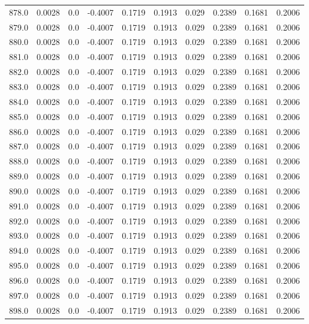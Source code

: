 \begin{longtable}{lrrrrrrrrr}
878.0 & 0.0028 & 0.0 & -0.4007 & 0.1719 & 0.1913 & 0.029 & 0.2389 & 0.1681 & 0.2006 \\
879.0 & 0.0028 & 0.0 & -0.4007 & 0.1719 & 0.1913 & 0.029 & 0.2389 & 0.1681 & 0.2006 \\
880.0 & 0.0028 & 0.0 & -0.4007 & 0.1719 & 0.1913 & 0.029 & 0.2389 & 0.1681 & 0.2006 \\
881.0 & 0.0028 & 0.0 & -0.4007 & 0.1719 & 0.1913 & 0.029 & 0.2389 & 0.1681 & 0.2006 \\
882.0 & 0.0028 & 0.0 & -0.4007 & 0.1719 & 0.1913 & 0.029 & 0.2389 & 0.1681 & 0.2006 \\
883.0 & 0.0028 & 0.0 & -0.4007 & 0.1719 & 0.1913 & 0.029 & 0.2389 & 0.1681 & 0.2006 \\
884.0 & 0.0028 & 0.0 & -0.4007 & 0.1719 & 0.1913 & 0.029 & 0.2389 & 0.1681 & 0.2006 \\
885.0 & 0.0028 & 0.0 & -0.4007 & 0.1719 & 0.1913 & 0.029 & 0.2389 & 0.1681 & 0.2006 \\
886.0 & 0.0028 & 0.0 & -0.4007 & 0.1719 & 0.1913 & 0.029 & 0.2389 & 0.1681 & 0.2006 \\
887.0 & 0.0028 & 0.0 & -0.4007 & 0.1719 & 0.1913 & 0.029 & 0.2389 & 0.1681 & 0.2006 \\
888.0 & 0.0028 & 0.0 & -0.4007 & 0.1719 & 0.1913 & 0.029 & 0.2389 & 0.1681 & 0.2006 \\
889.0 & 0.0028 & 0.0 & -0.4007 & 0.1719 & 0.1913 & 0.029 & 0.2389 & 0.1681 & 0.2006 \\
890.0 & 0.0028 & 0.0 & -0.4007 & 0.1719 & 0.1913 & 0.029 & 0.2389 & 0.1681 & 0.2006 \\
891.0 & 0.0028 & 0.0 & -0.4007 & 0.1719 & 0.1913 & 0.029 & 0.2389 & 0.1681 & 0.2006 \\
892.0 & 0.0028 & 0.0 & -0.4007 & 0.1719 & 0.1913 & 0.029 & 0.2389 & 0.1681 & 0.2006 \\
893.0 & 0.0028 & 0.0 & -0.4007 & 0.1719 & 0.1913 & 0.029 & 0.2389 & 0.1681 & 0.2006 \\
894.0 & 0.0028 & 0.0 & -0.4007 & 0.1719 & 0.1913 & 0.029 & 0.2389 & 0.1681 & 0.2006 \\
895.0 & 0.0028 & 0.0 & -0.4007 & 0.1719 & 0.1913 & 0.029 & 0.2389 & 0.1681 & 0.2006 \\
896.0 & 0.0028 & 0.0 & -0.4007 & 0.1719 & 0.1913 & 0.029 & 0.2389 & 0.1681 & 0.2006 \\
897.0 & 0.0028 & 0.0 & -0.4007 & 0.1719 & 0.1913 & 0.029 & 0.2389 & 0.1681 & 0.2006 \\
898.0 & 0.0028 & 0.0 & -0.4007 & 0.1719 & 0.1913 & 0.029 & 0.2389 & 0.1681 & 0.2006 \\

\end{longtable}
